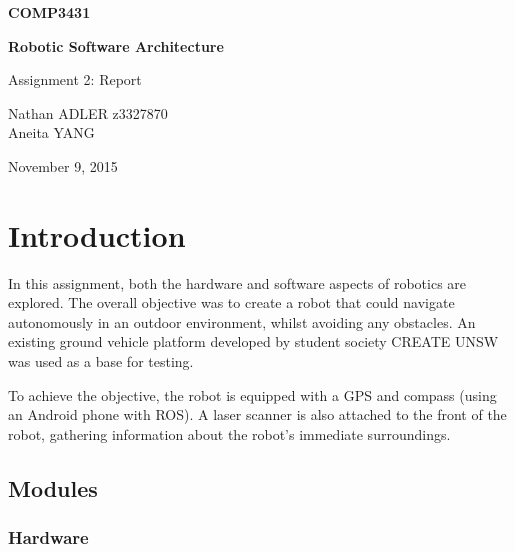 \documentclass[titlepage,12pt,a4paper]{article}
\begin{document}
\begin{titlepage}
    \begin{center}
        \vspace*{3cm}
        
        \Huge
        \textbf{COMP3431\\}
        \title{}
        \vspace{0.5cm}
        \Huge
        \textbf{Robotic Software Architecture}
        
        \vspace{0.54cm}
        
        \Large
        Assignment 2: Report
        
        \vspace{5cm}

	\large
	Nathan ADLER z3327870\\
	Aneita YANG\\

	\vfill
        
        \Large
        November 9, 2015
        
    \end{center}
\end{titlepage}

\pagebreak
\tableofcontents

\pagebreak
\section{Introduction}
In this assignment, both the hardware and software aspects of robotics are explored. The overall objective was to create a robot that could navigate autonomously in an outdoor environment, whilst avoiding any obstacles. An existing ground vehicle platform developed by student society CREATE UNSW was used as a base for testing.

To achieve the objective, the robot is equipped with a GPS and compass (using an Android phone with ROS). A laser scanner is also attached to the front of the robot, gathering information about the robot's immediate surroundings.

\subsection{Modules}

\subsubsection{Hardware}
\end{document}
